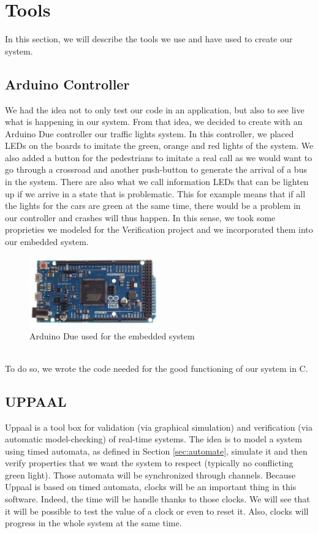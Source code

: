 \section{Tools}
In this section, we will describe the tools we use and have used to create our system.

\subsection{Arduino Controller}
We had the idea not to only test our code in an application, but also to see live what is happening in our system. From that idea, we decided to create with an Arduino Due controller our traffic lights system. In this controller, we placed LEDs on the boards to imitate the green, orange and red lights of the system. We also added a button for the pedestrians to imitate a real call as we would want to go through a crossroad and another push-button to generate the arrival of a bus in the system. There are also what we call information LEDs that can be lighten up if we arrive in a state that is problematic. This for example means that if all the lights for the cars are green at the same time, there would be a problem in our controller and crashes will thus happen. In this sense, we took some proprieties we modeled for the Verification project and we incorporated them into our embedded system.
\begin{figure}[!ht]\label{fig:arduino}
  \centering
    \includegraphics[width=0.5\textwidth]{picture/arduino.jpg}
    \caption{Arduino Due used for the embedded system}
\end{figure} \\
To do so, we wrote the code needed for the good functioning of our system in C.

\subsection{UPPAAL}
Uppaal is a tool box for validation (via graphical simulation) and verification (via automatic model-checking) of real-time systems. The idea is to model a system using timed automata, as defined in Section \ref{sec:automate}, simulate it and then verify properties that we want the system to respect (typically no conflicting green light). Those automata will be synchronized through channels. Because Uppaal is based on timed automata, clocks will be an important thing in this software. Indeed, the time will be handle thanks to those clocks. We will see that it will be possible to test the value of a clock or even to reset it. Also, clocks will progress in the whole system at the same time.

